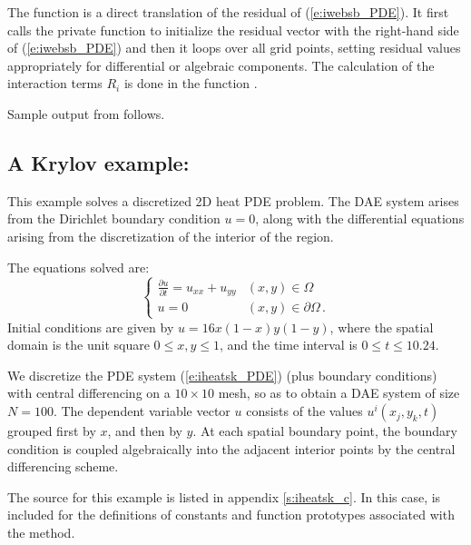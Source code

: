 The function  is a direct translation of the residual of (\ref{e:iwebsb_PDE}).
It first calls the private function  to initialize the residual vector
with the right-hand side of (\ref{e:iwebsb_PDE}) and then
it loops over all grid points, setting residual values appropriately for 
differential or algebraic components. The calculation of the interaction terms
$R_i$ is done in the function .


Sample output from  follows.
\vspace{0.1in}


\subsection{A Krylov example: }\label{ss:iheatsk}

This example solves a discretized 2D heat PDE problem. The DAE system
arises from the Dirichlet boundary condition $u = 0$, along with the 
differential equations arising from the discretization of the interior 
of the region. 

The equations solved are:
\begin{equation}\label{e:iheatsk_PDE}
\begin{cases}
  \frac{\partial u}{\partial t}  = u_{xx} + u_{yy}  & (x,y) \in \Omega \\
  u = 0 & (x,y) \in \partial\Omega\, .
\end{cases}
\end{equation}
Initial conditions are given by $u = 16x(1-x)y(1-y)$, where the spatial domain
is the unit square $0 \leq x,y \leq 1$, and the time interval is 
$0 \leq t \leq 10.24$.

We discretize the PDE system (\ref{e:iheatsk_PDE}) (plus boundary conditions)
with central differencing on a $10 \times 10$ mesh, so as to obtain a
DAE system of size $N = 100$.  The dependent variable vector $u$
consists of the values $u^i(x_j,y_k,t)$ grouped first by $x$, and then
by $y$.  At each spatial boundary point, the boundary condition is coupled
algebraically into the adjacent interior points by the central differencing
scheme. 

The source for this example is listed in appendix \ref{s:iheatsk_c}.
In this case,  is included for the definitions of
constants and function prototypes associated with the {\spgmr} method.

